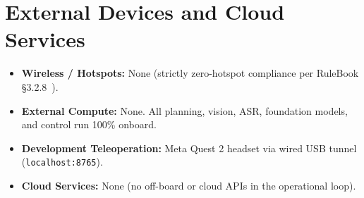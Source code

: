 \section*{External Devices and Cloud Services}
\begin{itemize}
	\item \textbf{Wireless / Hotspots:} None (strictly zero-hotspot compliance per RuleBook \S 3.2.8~\cite{robocup_rulebook_2026}).
	\item \textbf{External Compute:} None. All planning, vision, ASR, foundation models, and control run 100\% onboard.
	\item \textbf{Development Teleoperation:} Meta Quest 2 headset via wired USB tunnel (\texttt{localhost:8765}).
	\item \textbf{Cloud Services:} None (no off-board or cloud APIs in the operational loop).
\end{itemize}

